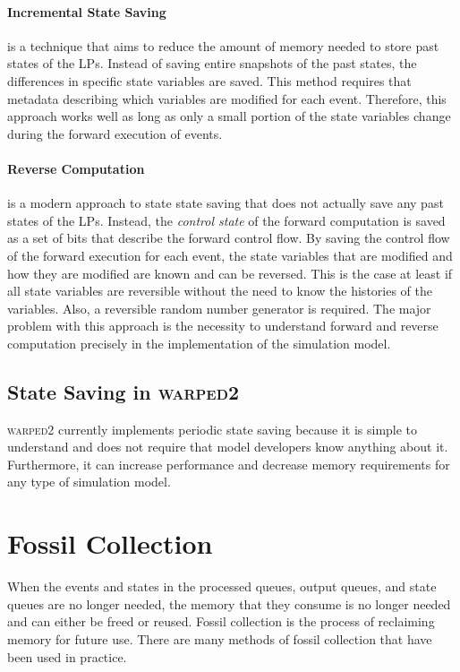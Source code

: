 \documentclass[11pt]{book}
\begin{document}
\paragraph{Incremental State Saving} is a technique that aims to reduce the amount of
memory needed to store past states of the LPs.  Instead of saving entire snapshots of the
past states, the differences in specific state variables are saved.  This method requires
that metadata describing which variables are modified for each event.  Therefore, this approach
works well as long as only a small portion of the state variables change during the forward
execution of events.

\paragraph{Reverse Computation} is a modern approach to state state saving that does not
actually save any past states of the LPs.  Instead, the \emph{control state} of the forward
computation is saved as a set of bits that describe the forward control flow.  By saving the control
flow of the forward execution for each event, the state variables that are modified and
how they are modified are known and can be reversed.  This is the case at least if all state variables
are reversible without the need to know the histories of the variables.  Also, a reversible
random number generator is required.  The major problem with this approach is the necessity to
understand forward and reverse computation precisely in the implementation of the simulation model.

\subsection{State Saving in \textsc{warped2}}

\textsc{warped2} currently implements periodic state saving because it is simple to understand
and does not require that model developers know anything about it.  Furthermore, it can increase
performance and decrease memory requirements for any type of simulation model.  

\section{Fossil Collection}

When the events and states in the processed queues, output queues, and state queues are
no longer needed, the memory that they consume is no longer needed and can either be freed
or reused.  Fossil collection is the process of reclaiming memory for future use.  There
are many methods of fossil collection that have been used in practice.
\end{document}
